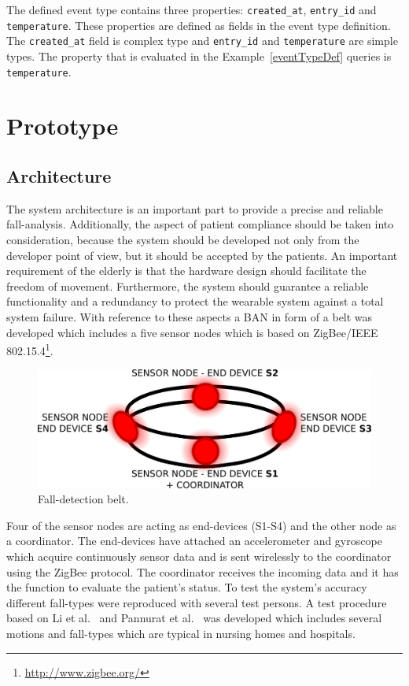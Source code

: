 \documentclass[conference]{IEEEtran}
\theoremstyle{definition}
\begin{document}
The defined event type contains three properties: \texttt{created\_at},
\texttt{entry\_id} and \texttt{temperature}. These properties are defined as
fields in the event type definition. The \texttt{created\_at} field is complex
type and \texttt{entry\_id} and \texttt{temperature} are simple types. The
property that is evaluated in the Example~\ref{eventTypeDef} queries is
\texttt{temperature}.

\section{Prototype}
\label{sec:basicprototype}

\subsection{Architecture}
\label{sub:basicprototypearchitecture}

The system architecture is an important part to provide a precise and reliable fall-analysis. 
Additionally, the aspect of patient compliance should be taken into consideration, because the 
system should be developed not only from the developer point of view, but it should be accepted 
by the patients. An important requirement of the elderly is that the hardware design should 
facilitate the freedom of movement. Furthermore, the system should guarantee a reliable 
functionality and a redundancy to protect the wearable system against a total system failure. 
With reference to these aspects a BAN in form of a belt was developed which 
includes a five sensor nodes which is based on ZigBee/IEEE 802.15.4\footnote{\url{http://www.zigbee.org/}}.

\begin{figure}[!h]
  \centering
  \includegraphics[scale=0.25]{./img/belt}
  \caption[Fall-detection belt]{Fall-detection belt.}
  \label{fig:belt}
\end{figure}

Four of the sensor nodes are acting as end-devices (S1-S4) and the other node as a coordinator. 
The end-devices have attached an accelerometer and gyroscope which acquire continuously sensor 
data and is sent wirelessly to the coordinator using the ZigBee protocol. The coordinator receives 
the incoming data and it has the function to evaluate the patient's status. 
To test the system's accuracy different fall-types were reproduced with several test persons. A 
test procedure based on Li et al.~\cite{Li2009} and Pannurat et al.~\cite{Pannurat2014} was developed which includes 
several motions and fall-types which are typical in nursing homes and hospitals.
\end{document}
